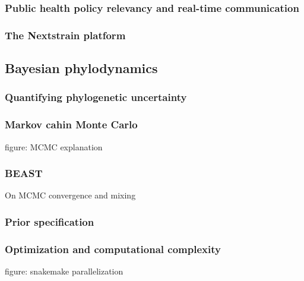       \subsubsection{Public health policy relevancy and real-time communication}
      \subsubsection{The Nextstrain platform}
    \subsection{Bayesian phylodynamics}
      \subsubsection{Quantifying phylogenetic uncertainty}
      \subsubsection{Markov cahin Monte Carlo}
      figure: MCMC explanation
      \subsubsection{BEAST}
      On MCMC convergence and mixing
      \subsubsection{Prior specification}
      \subsubsection{Optimization and computational complexity}
      figure: snakemake parallelization

